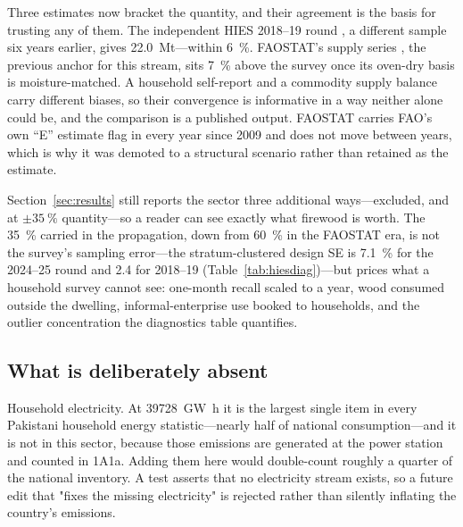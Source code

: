Three estimates now bracket the quantity, and their agreement is the basis for trusting any
of them. The independent HIES 2018--19 round \citep{hies2019}, a different sample six years
earlier, gives \SI{22.0}{\mega\tonne}---within \SI{6}{\percent}. FAOSTAT's supply series
\citep{faostat}, the previous anchor for this stream, sits \SI{7}{\percent} above the
survey once its oven-dry basis is moisture-matched. A household self-report and a commodity
supply balance carry different biases, so their convergence is informative in a way
neither alone could be, and the comparison is a published output. FAOSTAT carries FAO's own ``E'' estimate flag in every year since 2009 and does not
move between years, which is why it was demoted to a structural scenario rather than retained
as the estimate.

Section~\ref{sec:results} still reports the sector three
additional ways---excluded, and at $\pm\SI{35}{\percent}$ quantity---so a reader can see
exactly what firewood is worth. The \SI{35}{\percent} carried in the propagation, down from
\SI{60}{\percent} in the FAOSTAT era, is not the survey's sampling error---the
stratum-clustered design SE is \SI{7.1}{\percent} for the 2024--25 round and
\SI{2.4}{} for 2018--19 (Table~\ref{tab:hiesdiag})---but prices what a household survey
cannot see: one-month recall scaled to a year, wood consumed outside the dwelling,
informal-enterprise use booked to households, and the outlier concentration the
diagnostics table quantifies.

\subsection{What is deliberately absent}

Household electricity. At \SI{39728}{\giga\watt\hour} it is the largest single item in every
Pakistani household energy statistic---nearly half of national consumption---and it is not in
this sector, because those emissions are generated at the power station and counted in 1A1a.
Adding them here would double-count roughly a quarter of the national inventory. A test asserts
that no electricity stream exists, so a future edit that "fixes the missing
electricity" is rejected rather than silently inflating the country's emissions.

